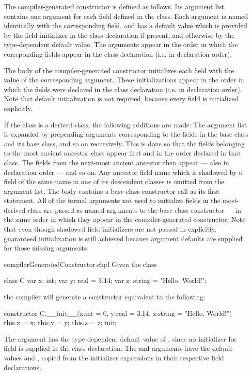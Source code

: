 The compiler-generated constructor is defined as follows.  Its argument list
contains one argument for each field defined in the class.  Each argument is
named identically with the corresponding field, and has a default value
which is provided by the field initializer in the class declaration if present,
and otherwise by the type-dependent default value.  The arguments appear in the
order in which the correponding fields appear in the class declaration (i.e. in
declaration order).

The body of the compiler-generated
constructor initializes each field with the value of the corresponding
argument.  These initializations appear in the order in which the fields were
declared in the class declaration (i.e. in declaration order).  Note that default
initialization is not required, because every field is initialized explicitly.

If the class is a derived class, the following additions are made: The argument
list is expanded by prepending arguments corresponding to the fields in the base
class and its base class, and so on recursively.  This is done so that the
fields belonging to the most ancient ancestor class appear first and in the
order declared in that class.  The fields from the next-most ancient ancestor
then appear --- also in declaration order --- and so on.  Any ancestor field name
which is shadowed by a field of the same name in one of its descendent classes
is omitted from the argument
list.  The body contains a base-class constructor call
as its first statement.  All of the formal arguments not used to initialize
fields in the most-derived class are passed as named arguments to the
base-class constructor --- in the same order in which they appear in the
compiler-generated constructor.
Note that even though shadowed field initializers are not passed in explicitly,
guaranteed initialization is still achieved because argument defaults are
supplied for those missing arguments.

\begin{chapelexample}{compilerGeneratedConstructor.chpl}
Given the class
\begin{chapel}
class C {
  var x: int;
  var y: real = 3.14;
  var z: string = "Hello, World!";
}
\end{chapel}
the compiler will generate a constructor equivalent to the following:
\begin{chapel}
constructor C.__init__(x:int = 0, y:real = 3.14, z:string = "Hello, World!")
{ this.x = x; this.y = y; this.z = z; init; }
\end{chapel}
The  argument has the type-dependent default value of , since no initializer for
field  is supplied in the class declaration. The  and 
arguments have the default values  and ,
copied from the initializer expressions in their respective field declarations.
\end{chapelexample}

